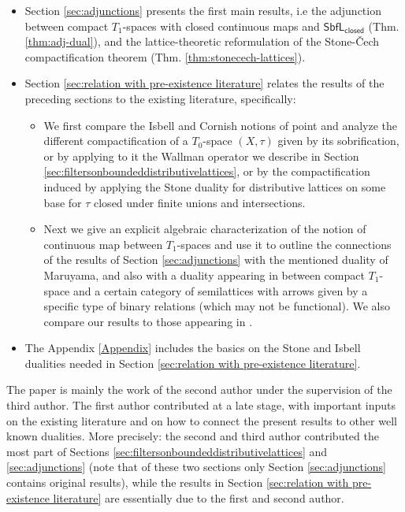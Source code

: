 \documentclass{article}
\theoremstyle{plain}
\theoremstyle{definition}
\theoremstyle{remark}
\newcommand{\bool}[1]{\mathsf{#1}}
\newcommand{\0}{\mathbbm 0}
\newcommand{\1}{\mathbbm 1}
\newcommand{\2}{\mathbbm 2}
\begin{document}
\begin{itemize}
\item
Section \ref{sec:adjunctions}
presents the first main results, i.e the adjunction between compact $T_1$-spaces with closed continuous maps and $\bool{SbfL}_\bool{closed}$ (Thm. \ref{thm:adj-dual}), and the lattice-theoretic reformulation of the Stone-\v{C}ech compactification theorem (Thm. \ref{thm:stonecech-lattices}).
\item
Section \ref{sec:relation with pre-existence literature} 
relates the results of the preceding sections to the existing literature, specifically:
\begin{itemize}
\item
We first compare the Isbell and Cornish notions of point and analyze the different compactification of a $T_0$-space $(X,\tau)$ given by its sobrification, or by applying to it the Wallman operator we describe in Section \ref{sec:filtersonboundeddistributivelattices}, or by the compactification induced by applying the Stone duality for distributive lattices on some base for $\tau$ closed under finite unions and intersections.
\item
Next we give an explicit algebraic characterization of the notion of continuous map between $T_1$-spaces and use it to outline the connections of the results of Section \ref{sec:adjunctions} with the mentioned duality of Maruyama, and also with a duality appearing in \cite{bice2020wallmandualitysemilatticesubbases} between compact $T_1$-space and a certain category of semilattices with arrows given by a specific type of binary relations (which may not be functional).
We also compare our results to those appearing in \cite{bice2020wallmandualitysemilatticesubbases}.
\end{itemize}
\item
The Appendix \ref{Appendix} includes the basics on the Stone and Isbell dualities needed in Section \ref{sec:relation with pre-existence literature}.


\end{itemize}

The paper is mainly the work of the second author under the supervision of the third author. The first author contributed at a late stage, with important inputs on the existing literature and on how to connect the present results to other well known dualities. 
More precisely:
the second and third author contributed the most part of Sections \ref{sec:filtersonboundeddistributivelattices} and \ref{sec:adjunctions} (note that of these two sections only Section \ref{sec:adjunctions} contains original results), while the results in Section  \ref{sec:relation with pre-existence literature}  are essentially due to the first and second author.
\end{document}
